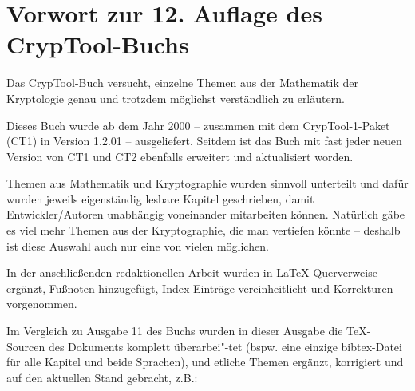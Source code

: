 %

\clearpage
\chapter*{Vorwort zur 12. Auflage des CrypTool-Buchs}
\setcounter{secnumdepth}{4}  %

Das CrypTool-Buch versucht, einzelne Themen aus der Mathematik der Kryptologie
genau und trotzdem möglichst verständlich zu erläutern.

Dieses Buch wurde ab dem Jahr 2000 -- zusammen mit dem CrypTool-1-Paket
(CT1) in Version 1.2.01 -- ausgeliefert.
Seitdem ist das Buch mit fast jeder neuen Version von CT1 und CT2 ebenfalls erweitert
und aktualisiert worden.

Themen aus Mathematik und Kryptographie wurden sinnvoll unterteilt und dafür
wurden jeweils eigenständig lesbare Kapitel geschrieben, damit
Entwickler/Autoren unabhängig voneinander mitarbeiten können. Natürlich gäbe
es viel mehr Themen aus der Kryptographie, die man vertiefen könnte -- deshalb
ist diese Auswahl auch nur eine von vielen möglichen.

In der anschließenden redaktionellen Arbeit wurden in LaTeX Querverweise ergänzt,
Fußnoten hinzugefügt, Index-Einträge vereinheitlicht und Korrekturen vorgenommen.

Im Vergleich zu Ausgabe 11 des Buchs wurden in dieser Ausgabe
die TeX-Sourcen des Dokuments komplett überarbei"-tet (bspw. eine einzige
bibtex-Datei für alle Kapitel und beide Sprachen), und
etliche Themen ergänzt, korrigiert und auf den aktuellen Stand gebracht, z.B.:
\vspace{-5pt}


